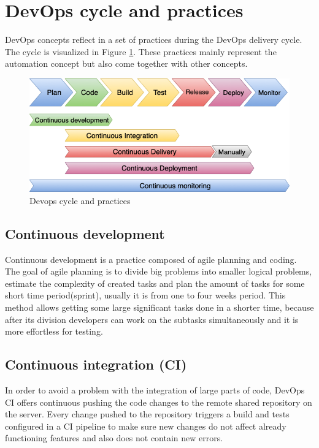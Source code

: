\section{DevOps cycle and practices} DevOps concepts reflect in a set of practices during the DevOps delivery cycle. The cycle is visualized in Figure \ref{picture:devops}. These practices mainly represent the automation concept but also come together with other concepts. \cite{devops-principles}

\begin{figure}[h]
\centering
\includegraphics[scale=0.56]{../png/devops.png}
\caption{Devops cycle and practices}\label{picture:devops}
\end{figure}

\subsection{Continuous development} Continuous development is a practice composed of agile planning and coding. The goal of agile planning  is to divide big problems into smaller logical problems, estimate the complexity of created tasks and plan the amount of tasks for some short time period(sprint), usually it is from one to four weeks period. This method allows getting some large significant tasks done in a shorter time, because after its division developers can work on the subtasks simultaneously and it is more effortless for testing.

\subsection{Continuous integration (CI)} In order to avoid a problem with the integration of large parts of code, DevOps CI offers continuous pushing the code changes to the remote shared repository on the server. Every change pushed to the repository triggers a build and tests configured in a CI pipeline to make sure new changes do not affect already functioning features and also does not contain new errors.

